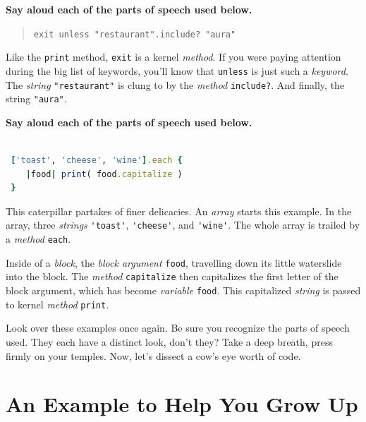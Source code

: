 \documentclass[10pt,twoside]{report}
\begin{document}
{\bf Say aloud each of the parts of speech used below.}

\begin{quote}
\lstinline[breaklines=true]|exit unless "restaurant".include? "aura"|\end{quote}


Like the \lstinline[breaklines=true]|print| method,
\lstinline[breaklines=true]|exit| is a kernel {\em method}.  If you
were paying attention during the big list of keywords, you'll know
that \lstinline[breaklines=true]|unless| is just such a {\em keyword}.
The {\em string} \lstinline[breaklines=true]|"restaurant"| is clung to
by the {\em method} \lstinline[breaklines=true]|include?|.  And
finally, the string \lstinline[breaklines=true]|"aura"|.

{\bf Say aloud each of the parts of speech used below.}

\begin{lstlisting}[basicstyle=\ttfamily\color{basiccolor},
    commentstyle = \ttfamily\color{commentcolor},
    keywordstyle=\ttfamily\color{keywordscolor},
    stringstyle=\color{stringcolor},
    language=Ruby,
    basicstyle=\small\ttfamily,
    showstringspaces=false,
  ]

 ['toast', 'cheese', 'wine'].each { 
 	|food| print( food.capitalize ) 
 }

\end{lstlisting}

This caterpillar partakes of finer delicacies.  An {\em array} starts
this example.  In the array, three {\em strings}
\lstinline[breaklines=true]|'toast'|,
\lstinline[breaklines=true]|'cheese'|, and
\lstinline[breaklines=true]|'wine'|.  The whole array is trailed by a
          {\em method} \lstinline[breaklines=true]|each|.

Inside of a {\em block}, the {\em block argument}
\lstinline[breaklines=true]|food|, travelling down its little
waterslide into the block.  The {\em method}
\lstinline[breaklines=true]|capitalize| then capitalizes the first
letter of the block argument, which has become {\em variable}
\lstinline[breaklines=true]|food|.  This capitalized {\em string} is
passed to kernel {\em method} \lstinline[breaklines=true]|print|.

Look over these examples once again.  Be sure you recognize the parts
of speech used.  They each have a distinct look, don't they?  Take a
deep breath, press firmly on your temples.  Now, let's dissect a cow's
eye worth of code.


\section{An Example to Help You Grow Up}
\end{document}
